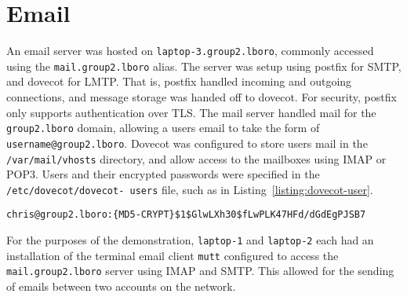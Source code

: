 \section{Email}
    An email server was hosted on \texttt{laptop-3.group2.lboro}, commonly
    accessed using the \texttt{mail.group2.lboro} alias. The server was setup
    using postfix for SMTP, and dovecot for LMTP. That is, postfix handled
    incoming and outgoing connections, and message storage was handed off to
    dovecot. For security, postfix only supports authentication over TLS. The
    mail server handled mail for the \texttt {group2.lboro} domain, allowing a
    users email to take the form of \texttt{username@group2.lboro}. Dovecot was
    configured to store users mail in the \texttt{/var/mail/vhosts} directory,
    and allow access to the mailboxes using IMAP or POP3. Users and their
    encrypted passwords were specified in the \texttt{/etc/dovecot/dovecot-
    users} file, such as in Listing~\ref {listing:dovecot-user}.

    \begin{lstlisting}[caption={Dovecot user}, label={listing:dovecot-user}]
chris@group2.lboro:{MD5-CRYPT}$1$GlwLXh30$fLwPLK47HFd/dGdEgPJSB7
    \end{lstlisting}

    For the purposes of the demonstration, \texttt{laptop-1} and \texttt
    {laptop-2} each had an installation of the terminal email client \texttt
    {mutt} configured to access the \texttt{mail.group2.lboro} server using
    IMAP and SMTP. This allowed for the sending of emails between two accounts
    on the network.

